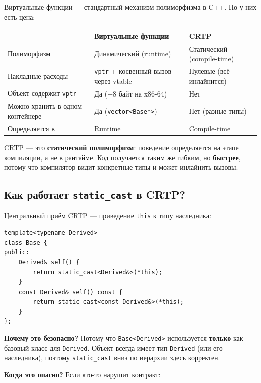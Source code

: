 \documentclass[a4paper,12pt]{article}
\begin{document}
Виртуальные функции --- стандартный механизм полиморфизма в C++. Но у них
есть цена:

\begin{center}
\begin{tabular}{lp{5cm}p{5cm}}
\toprule
& \textbf{Виртуальные функции} & \textbf{CRTP} \\
\midrule
Полиморфизм
    & Динамический (runtime)
    & Статический (compile-time) \\
\addlinespace
Накладные расходы
    & \texttt{vptr} + косвенный вызов через vtable
    & Нулевые (всё инлайнится) \\
\addlinespace
Объект содержит \texttt{vptr}
    & Да (+8 байт на x86-64)
    & Нет \\
\addlinespace
Можно хранить в одном контейнере
    & Да (\texttt{vector<Base*>})
    & Нет (разные типы) \\
\addlinespace
Определяется в
    & Runtime
    & Compile-time \\
\bottomrule
\end{tabular}
\end{center}

CRTP --- это \textbf{статический полиморфизм}: поведение определяется на этапе
компиляции, а не в рантайме. Код получается таким же гибким, но \textbf{быстрее},
потому что компилятор видит конкретные типы и может инлайнить вызовы.

\subsection{Как работает \texttt{static\_cast} в CRTP?}

Центральный приём CRTP --- приведение \texttt{this} к типу наследника:

\begin{lstlisting}
template<typename Derived>
class Base {
public:
    Derived& self() {
        return static_cast<Derived&>(*this);
    }
    const Derived& self() const {
        return static_cast<const Derived&>(*this);
    }
};
\end{lstlisting}

\textbf{Почему это безопасно?} Потому что \texttt{Base<Derived>} используется
\textbf{только} как базовый класс для \texttt{Derived}. Объект всегда имеет тип
\texttt{Derived} (или его наследника), поэтому \texttt{static\_cast} вниз
по иерархии здесь корректен.

\textbf{Когда это опасно?} Если кто-то нарушит контракт:
\end{document}
